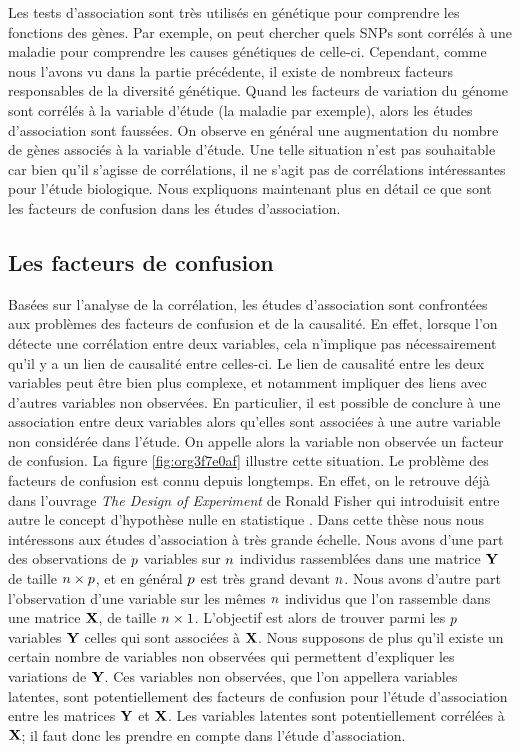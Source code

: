 \documentclass[12pt,a4paper,twoside]{ugathesis}
\begin{document}
Les tests d'association sont très utilisés en génétique pour comprendre les
fonctions des gènes. Par exemple, on peut chercher quels SNPs sont corrélés à
une maladie pour comprendre les causes génétiques de celle-ci. Cependant, comme
nous l'avons vu dans la partie précédente, il existe de nombreux facteurs
responsables de la diversité génétique. Quand les facteurs de variation du
génome sont corrélés à la variable d'étude (la maladie par exemple), alors les
études d'association sont faussées. On observe en général une augmentation du
nombre de gènes associés à la variable d'étude. Une telle situation n'est pas
souhaitable car bien qu'il s'agisse de corrélations, il ne s'agit pas de
corrélations intéressantes pour l'étude biologique. Nous expliquons maintenant
plus en détail ce que sont les facteurs de confusion dans les études
d'association.

\subsection{Les facteurs de confusion}
\label{sec:org27d0f6b}
\label{orgcce343e}

Basées sur l'analyse de la corrélation, les études d'association sont
confrontées aux problèmes des facteurs de confusion et de la causalité. En
effet, lorsque l'on détecte une corrélation entre deux variables, cela
n'implique pas nécessairement qu'il y a un lien de causalité entre celles-ci. Le
lien de causalité entre les deux variables peut être bien plus complexe, et
notamment impliquer des liens avec d'autres variables non observées. En
particulier, il est possible de conclure à une association entre deux variables
alors qu'elles sont associées à une autre variable non considérée dans l'étude.
On appelle alors la variable non observée un facteur de confusion. La figure
\ref{fig:org3f7e0af} illustre cette situation. Le problème des facteurs de
confusion est connu depuis longtemps. En effet, on le retrouve déjà dans
l'ouvrage \emph{The Design of Experiment} de Ronald Fisher qui introduisit entre
autre le concept d'hypothèse nulle en statistique \citep{fisher1937design}. Dans
cette thèse nous nous intéressons aux études d'association à très grande
échelle. Nous avons d'une part des observations de \(p\) variables sur \(n\)
individus rassemblées dans une matrice \(\mathbf{Y}\) de taille \(n \times p\), et
en général \(p\) est très grand devant \(n\). Nous avons d'autre part
l'observation d'une variable sur les mêmes \(n\) individus que l'on rassemble
dans une matrice \(\mathbf{X}\), de taille \(n \times 1\). L'objectif est alors de
trouver parmi les \(p\) variables \(\mathbf{Y}\) celles qui sont associées à \(\mathbf{X}\). Nous
supposons de plus qu'il existe un certain nombre de variables non observées qui
permettent d'expliquer les variations de \(\mathbf{Y}\). Ces variables non observées, que
l'on appellera variables latentes, sont potentiellement des facteurs de
confusion pour l'étude d'association entre les matrices \(\mathbf{Y}\) et \(\mathbf{X}\). Les
variables latentes sont potentiellement corrélées à \(\mathbf{X}\); il faut donc les
prendre en compte dans l'étude d'association.
\end{document}
